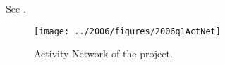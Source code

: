 \begin{subquestions}
\begin{subsubquestions}
\end{subsubquestions}


\subquestion

See .

\begin{figure}
	\begin{center}
		\texttt{[image: ../2006/figures/2006q1ActNet]}
		\caption{\label{2006:q1:fig:ActNet} Activity Network of the project.}
	\end{center}
\end{figure}

\end{subquestions}

